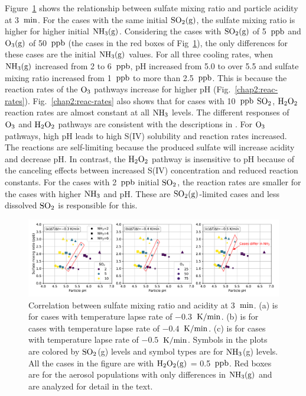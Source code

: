 \documentclass[edeposit,fullpage]{uiucthesis2009}
\makeatletter
\DeclareRobustCommand*\unit[1]
 {\ensuremath{%
   {\thinmuskip3mu\relax
    \def\mu{\text{\textmu}}\def~{\,}%
    \ifx\f@series\testbx\mathbf{#1}\else\mathrm{#1}\fi}}}
\makeatother
\begin{document}
Figure~\ref{chap2:su-acidity} shows the relationship between sulfate
mixing ratio and particle acidity at 3~\unit{min}. For the cases with
the same initial $\rm SO_2(g)$, the sulfate mixing ratio is higher for
higher initial $\rm NH_3(g)$. Considering the cases with $\rm SO_2(g)$
of 5~\unit{ppb} and $\rm O_3(g)$ of 50~\unit{ppb} (the cases in the
red boxes of Fig~\ref{chap2:su-acidity}), the only differences for
these cases are the initial $\rm NH_3(g)$ values. For all three
cooling rates, when $\rm NH_3(g)$ increased from 2 to 6~\unit{ppb}, pH
increased from 5.0 to over 5.5 and sulfate mixing ratio increased from
1~\unit{ppb} to more than 2.5~\unit{ppb}. This is because the reaction
rates of the $\rm O_3$ pathways increase for higher pH
(Fig.~\ref{chap2:reac-rates}). Fig.~\ref{chap2:reac-rates} also shows
that for cases with 10~\unit{ppb} $\rm SO_2$, $\rm H_2O_2$ reaction
rates are almost constant at all $\rm NH_3$ levels. The different
responses of $\rm O_3$ and $\rm H_2O_2$ pathways are consistent with
the descriptions in \citet{Seinfeld2016}. For $\rm O_3$ pathways, high
pH leads to high S(IV) solubility and reaction rates increased. The
reactions are self-limiting because the produced sulfate will increase
acidity and decrease pH. In contrast, the $\rm H_2O_2$ pathway is
insensitive to pH because of the canceling effects between increased
S(IV) concentration and reduced reaction constants. For the cases with
2~\unit{ppb} initial $\rm SO_2$, the reaction rates are smaller for
the cases with higher $\rm NH_3$ and pH. These are $\rm
SO_2(g)$-limited cases and less dissolved $\rm SO_2$ is responsible
for this.

\begin{figure}[ht]
    \centering \includegraphics[scale=0.55]{chap2_figs/chap2_fig4_sulfate_pH_3min.pdf}
    \caption{Correlation between sulfate mixing ratio and acidity at
      3~\unit{min}. (a) is for cases with temperature lapse rate of
      $-0.3$~\unit{K/min}. (b) is for cases with temperature lapse
      rate of $-0.4$~\unit{K/min}. (c) is for cases with temperature
      lapse rate of $-0.5$~\unit{K/min}. Symbols in the plots are
      colored by $\rm SO_2$(g) levels and symbol types are for $\rm
      NH_3$(g) levels. All the cases in the figure are with $\rm
      H_2O_2(g)$ = 0.5~\unit{ppb}. Red boxes are for the aerosol
      populations with only differences in $\rm NH_3(g)$ and are
      analyzed for detail in the text.}
    \label{chap2:su-acidity}
\end{figure}
\end{document}
